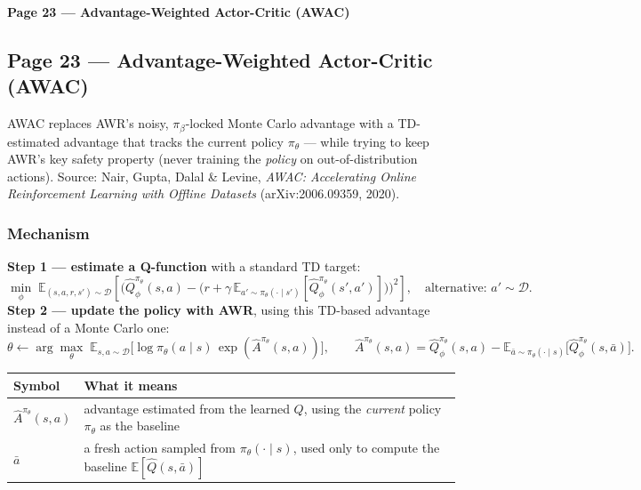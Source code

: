 \bigskip

\textbf{Page 23 --- Advantage-Weighted Actor-Critic (AWAC)}

\subsection*{Page 23 --- Advantage-Weighted Actor-Critic (AWAC)}

AWAC replaces AWR's noisy, $\pi_\beta$-locked Monte Carlo advantage with a TD-estimated advantage that tracks the current policy $\pi_\theta$ --- while trying to keep AWR's key safety property (never training the \emph{policy} on out-of-distribution actions). Source: Nair, Gupta, Dalal \& Levine, \emph{AWAC: Accelerating Online Reinforcement Learning with Offline Datasets} (arXiv:2006.09359, 2020).

\subsubsection*{Mechanism}

\textbf{Step 1 --- estimate a Q-function} with a standard TD target:
\[
\min_\phi\; \mathbb{E}_{(s,a,r,s')\sim\mathcal{D}}\left[\Big(\hat Q^{\pi_\theta}_\phi(s,a) - \big(r + \gamma\,\mathbb{E}_{a'\sim\pi_\theta(\cdot\mid s')}[\hat Q^{\pi_\theta}_\phi(s',a')]\big)\Big)^2\right], \quad \text{alternative: } a' \sim \mathcal{D}.
\]
\textbf{Step 2 --- update the policy with AWR}, using this TD-based advantage instead of a Monte Carlo one:
\[
\theta \leftarrow \arg\max_\theta\; \mathbb{E}_{s,a\sim\mathcal{D}}\big[\log\pi_\theta(a\mid s)\,\exp(\hat A^{\pi_\theta}(s,a))\big], \qquad
\hat A^{\pi_\theta}(s,a) = \hat Q^{\pi_\theta}_\phi(s,a) - \mathbb{E}_{\bar a\sim\pi_\theta(\cdot\mid s)}\big[\hat Q^{\pi_\theta}_\phi(s,\bar a)\big].
\]

\begin{center}
\begin{tabular}{@{}ll@{}}
\toprule
Symbol & What it means \\
\midrule
$\hat A^{\pi_\theta}(s,a)$ & advantage estimated from the learned $Q$, using the \emph{current} policy $\pi_\theta$ as the baseline \\
$\bar a$ & a fresh action sampled from $\pi_\theta(\cdot\mid s)$, used only to compute the baseline $\mathbb E[\hat Q(s,\bar a)]$ \\
\bottomrule
\end{tabular}
\end{center}

